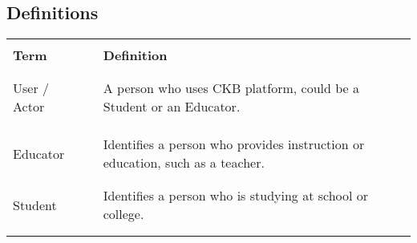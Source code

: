 \subsection{Definitions}
\begin{table}[H]
    \centering
    \renewcommand{\arraystretch}{0.5}
    \begin{tabular}{l l p{10cm}}
        \hline
                            &        &                                                                                                                        \\
        \textbf{Term}       & \vline & \textbf{Definition}                                                                                                    \\
                            &        &                                                                                                                        \\\hline \\
        User / Actor        & \vline & A person who uses CKB platform, could be a Student or an Educator.                                                     \\                                                                                                                                                                                                                                 \\
                            &        &                                                                                                                        \\\hline \\
        Educator            & \vline & Identifies a person who provides instruction or education, such as a teacher.                                          \\
                            &        &                                                                                                                        \\\hline \\
        Student             & \vline & Identifies a person who is studying at school or college.                                                              \\
                            &        &                                                                                                                        \\\hline \\

\end{tabular}
\end{table}
